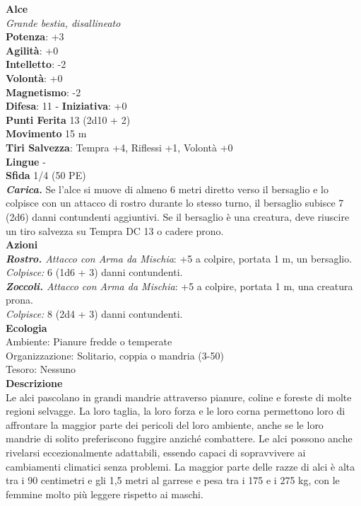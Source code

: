 \begin{multicols}{2}
\medskip\textbf{Alce}\\
\emph{Grande bestia, disallineato}\\
\textbf{Potenza}: +3\\
\textbf{Agilità}: +0\\
\textbf{Intelletto}: -2\\
\textbf{Volontà}: +0\\
\textbf{Magnetismo}: -2\\
\textbf{Difesa}: 11 - \textbf{Iniziativa}: +0\\
\textbf{Punti Ferita} 13 (2d10 + 2)\\
\textbf{Movimento} 15 m\\
\textbf{Tiri Salvezza}:  Tempra +4, Riflessi +1, Volontà +0\\
\textbf{Lingue} -\\
\textbf{Sfida} 1/4 (50 PE)\smallskip\\
\emph{\textbf{Carica.}} Se l'alce si muove di almeno 6 metri diretto verso il bersaglio e lo colpisce con un attacco di rostro durante lo stesso turno, il bersaglio subisce 7 (2d6) danni contundenti aggiuntivi. Se il bersaglio è una creatura, deve riuscire un tiro salvezza su Tempra DC 13 o cadere prono.\\
\smallskip\textbf{Azioni}\\
\emph{\textbf{Rostro.} Attacco con Arma da Mischia}: +5 a colpire, portata 1 m, un bersaglio.\\
\emph{Colpisce:} 6 (1d6 + 3) danni contundenti.\\
\emph{\textbf{Zoccoli.} Attacco con Arma da Mischia}: +5 a colpire, portata 1 m, una creatura prona.\\
\emph{Colpisce:} 8 (2d4 + 3) danni contundenti.\\
\textbf{Ecologia}\\
Ambiente: Pianure fredde o temperate\\
Organizzazione: Solitario, coppia o mandria (3-50)\\
Tesoro: Nessuno\\
\textbf{Descrizione}\\
Le alci pascolano in grandi mandrie attraverso pianure, coline e foreste di molte regioni selvagge. La loro taglia, la loro forza e le loro corna permettono loro di affrontare la maggior parte dei pericoli del loro ambiente, anche se le loro mandrie di solito preferiscono fuggire anziché combattere. Le alci possono anche rivelarsi eccezionalmente adattabili, essendo capaci di sopravvivere ai cambiamenti climatici senza problemi. La maggior parte delle razze di alci è alta tra i 90 centimetri e gli 1,5 metri al garrese e pesa tra i 175 e i 275 kg, con le femmine molto più leggere rispetto ai maschi.\\


\end{multicols}
